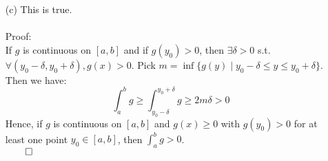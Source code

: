 \documentclass[11pt]{article}
\begin{document}
\begin{itemize}
\begin{itemize}
            \item[(c)]
                This is true.
                \\
                \\
                Proof:\\
                If $g$ is continuous on $[a, b]$ and if $g(y_0) > 0$, then
                $\exists \delta > 0$ s.t. $\forall (y_0 - \delta, y_0 +
                \delta), g(x) > 0$. Pick $m = \inf \{g(y) \mid y_0 - \delta
                \leq y \leq y_0 + \delta\}$. Then we have:
                \begin{equation*}
                    \int_a^b g \geq \int_{y_0 - \delta}^{y_0 + \delta} g
                               \geq 2m\delta > 0
                \end{equation*}
                Hence, if $g$ is continuous on $[a, b]$ and $g(x) \geq 0$ with
                $g(y_0) > 0$ for at least one point $y_0 \in [a, b]$, then
                $\int_a^b g > 0$.\\
                $\qed$
        \end{itemize}
\end{itemize}

\end{document}
